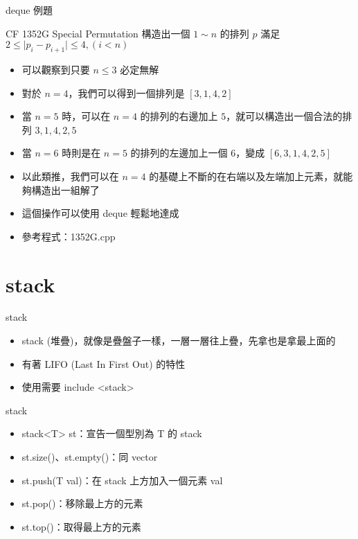 \documentclass[aspectratio=169]{beamer}
\begin{document}
    \begin{frame}{deque 例題}
        \begin{block}{CF 1352G Special Permutation}
            構造出一個 $1 \sim n$ 的排列 $p$ 滿足 $2 \le \mid p_i - p_{i+1} \mid \le 4, (i < n)$
        \end{block}

        \begin{itemize}
            \item<2-> 可以觀察到只要 $n \le 3$ 必定無解
            \item<3-> 對於 $n = 4$，我們可以得到一個排列是 $[3, 1, 4, 2]$
            \item<4-> 當 $n = 5$ 時，可以在 $n=4$ 的排列的右邊加上 $5$，就可以構造出一個合法的排列 $3, 1, 4, 2, 5$
            \item<5-> 當 $n = 6$ 時則是在 $n=5$ 的排列的左邊加上一個 $6$，變成 $[6, 3, 1, 4, 2, 5]$
            \item<6-> 以此類推，我們可以在 $n=4$ 的基礎上不斷的在右端以及左端加上元素，就能夠構造出一組解了
            \item<7-> 這個操作可以使用 deque 輕鬆地達成
            \item<7-> 參考程式：1352G.cpp
        \end{itemize}
    \end{frame}

    \section{stack}

    \begin{frame}{stack}
        \begin{itemize}
            \item<1-> stack (堆疊)，就像是疊盤子一樣，一層一層往上疊，先拿也是拿最上面的
            \item<2-> 有著 LIFO (Last In First Out) 的特性
            \item<2-> 使用需要 include <stack>
        \end{itemize}
    \end{frame}

    \begin{frame}{stack}
        \begin{itemize}
            \item<1-> stack<T> st：宣告一個型別為 T 的 stack
            \item<1-> st.size()、st.empty()：同 vector
            \item<2-> st.push(T val)：在 stack 上方加入一個元素 val
            \item<2-> st.pop()：移除最上方的元素
            \item<3-> st.top()：取得最上方的元素
        \end{itemize}
    \end{frame}
\end{document}

